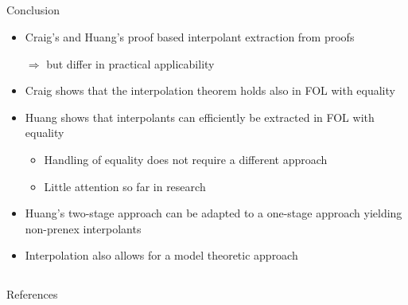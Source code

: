 \documentclass[final,compress]{beamer}
\begin{document}
\subsection{}
\begin{frame}{Conclusion}
	\begin{itemize}
		\item Craig's and Huang's proof based interpolant extraction from proofs

			$\Rightarrow$ but differ in practical applicability 

		\item Craig shows that the interpolation theorem holds also in FOL with equality
		\item Huang shows that interpolants can efficiently be extracted in FOL with equality

			\begin{itemize}
				\item Handling of equality does not require a different approach
				\item Little attention so far in research
			\end{itemize}

		\item Huang's two-stage approach can be adapted to a one-stage approach yielding non-prenex interpolants

		\item Interpolation also allows for a model theoretic approach

	\end{itemize}
\end{frame}

\subsection{}
\begin{frame}{References}
	
\end{frame}
\end{document}

